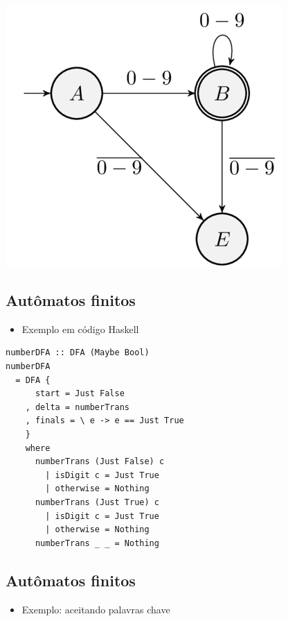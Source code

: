\documentclass[11pt]{article}
\begin{document}
\begin{center}
\includegraphics[width=.9\linewidth]{./imgs/image1.png}
\end{center}
\subsection*{Autômatos finitos}
\label{sec:org3eaef01}

\begin{itemize}
\item Exemplo em código Haskell
\end{itemize}

\begin{verbatim}
numberDFA :: DFA (Maybe Bool)
numberDFA
  = DFA {
      start = Just False
    , delta = numberTrans
    , finals = \ e -> e == Just True
    }
    where
      numberTrans (Just False) c
        | isDigit c = Just True
        | otherwise = Nothing
      numberTrans (Just True) c
        | isDigit c = Just True
        | otherwise = Nothing
      numberTrans _ _ = Nothing
\end{verbatim}
\subsection*{Autômatos finitos}
\label{sec:orge2a1efb}

\begin{itemize}
\item Exemplo: aceitando palavras chave
\end{itemize}
\end{document}
